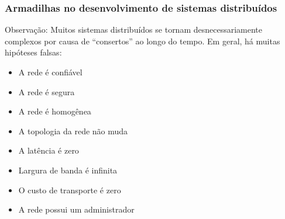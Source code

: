 \documentclass[Ligatures=TeX,table,brazil,svgnames,usetotalslideindicator,compress,10pt]{beamer}
\begin{document}
\begin{frame}
  \frametitle{Armadilhas no desenvolvimento de sistemas distribuídos}
  \begin{block}{Observação:}
    Muitos sistemas distribuídos se tornam desnecessariamente complexos por causa de ``consertos'' ao longo do tempo. Em geral, há muitas \alert{hipóteses falsas}:

    \begin{itemize}
    \item<2-> A rede é confiável
    \item<3-> A rede é segura
    \item<4-> A rede é homogênea
    \item<5-> A topologia da rede não muda
    \item<6-> A latência é zero
    \item<7-> Largura de banda é infinita
    \item<8-> O custo de transporte é zero
    \item<9-> A rede possui um administrador
    \end{itemize}
  \end{block}
\end{frame}
\end{document}
